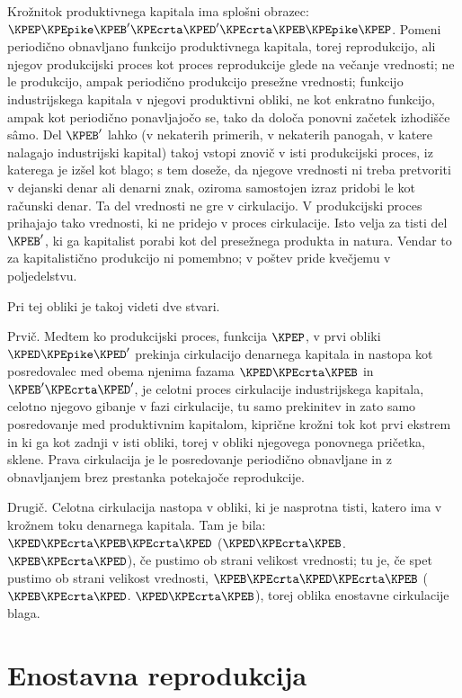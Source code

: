 \documentclass[kapital_02.tex]{subfiles}
\begin{document}
\setcounter{footnote}{5}
Krožni\KPEstran tok produktivnega kapitala ima splošni obrazec: \( \KPEP \KPEpike \KPEB' \KPEcrta \KPED' \KPEcrta \KPEB \KPEpike \KPEP \). Pomeni periodično obnavljano funkcijo produktivnega kapitala, torej reprodukcijo, ali njegov produkcijski proces kot proces reprodukcije glede na večanje vrednosti; ne le produkcijo, ampak periodično produkcijo presežne vrednosti; funkcijo industrijskega kapitala v njegovi produktivni obliki, ne kot enkratno funkcijo, ampak kot periodično ponavljajočo se, tako da določa ponovni začetek izhodišče s\^amo. Del \( \KPEB' \) lahko (v nekaterih primerih, v nekaterih panogah, v katere nalagajo industrijski kapital) takoj vstopi znovič v isti produkcijski proces, iz katerega je izšel kot blago; s tem doseže, da njegove vrednosti ni treba pretvoriti v dejanski denar ali denarni znak, oziroma samostojen izraz pridobi le kot računski denar. Ta del vrednosti ne gre v cirkulacijo. V produkcijski proces prihajajo tako vrednosti, ki ne pridejo v proces cirkulacije. Isto velja za tisti del \( \KPEB' \), ki ga kapitalist porabi kot del presežnega produkta in natura. Vendar to za kapitalistično produkcijo ni pomembno; v poštev pride kvečjemu v poljedelstvu.

Pri tej obliki je takoj videti dve stvari.

Prvič. Medtem ko produkcijski proces, funkcija \( \KPEP \), v prvi obliki \( \KPED\KPEpike\KPED' \) prekinja cirkulacijo denarnega kapitala in nastopa kot posredovalec med obema njenima fazama \( \KPED\KPEcrta\KPEB \) in \( \KPEB'\KPEcrta\KPED' \), je celotni proces cirkulacije industrijskega kapitala, celotno njegovo gibanje v fazi cirkulacije, tu samo prekinitev in zato samo posredovanje med produktivnim kapitalom, ki\KPEstran prične krožni tok kot prvi ekstrem in ki ga kot zadnji v isti obliki, torej v obliki njegovega ponovnega pričetka, sklene. Prava cirkulacija je le posredovanje periodično obnavljane in z obnavljanjem brez prestanka potekajoče reprodukcije.

Drugič. Celotna cirkulacija nastopa v obliki, ki je nasprotna tisti, katero ima v krožnem toku denarnega kapitala. Tam je bila: \( \KPED\KPEcrta\KPEB\KPEcrta\KPED \) (\( \KPED\KPEcrta\KPEB \). \( \KPEB\KPEcrta\KPED \)), če pustimo ob strani velikost vrednosti; tu je, če spet pustimo ob strani velikost vrednosti, \( \KPEB\KPEcrta\KPED\KPEcrta\KPEB \) (\( \KPEB\KPEcrta\KPED \). \( \KPED\KPEcrta\KPEB \)), torej oblika enostavne cirkulacije blaga.

\section{Enostavna reprodukcija}
\end{document}
